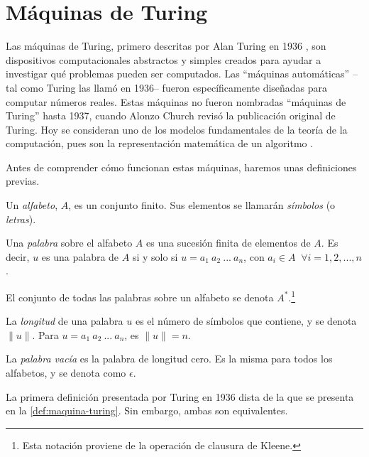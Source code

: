 

\section{Máquinas de Turing}\label{sec:maquinas-turing}

Las máquinas de Turing, primero descritas por Alan Turing en 1936 \cite{Turing1937}, son dispositivos computacionales abstractos y simples creados para ayudar a investigar qué problemas pueden ser computados. Las ``máquinas automáticas'' --tal como Turing las llamó en 1936-- fueron específicamente diseñadas para computar números reales. Estas máquinas no fueron nombradas ``máquinas de Turing'' hasta 1937, cuando Alonzo Church \cite{Church1937} revisó la publicación original de Turing. Hoy se consideran uno de los modelos fundamentales de la teoría de la computación, pues son la representación matemática de un algoritmo \cite{StanfordTuring2021}.

Antes de comprender cómo funcionan estas máquinas, haremos unas definiciones previas.

\begin{definicion}\label{def:preliminares}
Un \emph{alfabeto}, $A$, es un conjunto finito. Sus elementos se llamarán \emph{símbolos} (o \emph{letras}).

Una \emph{palabra} sobre el alfabeto $A$ es una sucesión finita de elementos de $A$. Es decir, $u$ es una palabra de $A$ si y solo si $u = a_1\:a_2\:...\:a_n$, con $a_i \in A \;\;\forall i = 1, 2, ..., n$.

El conjunto de todas las palabras sobre un alfabeto se denota $A^*$.\footnote{Esta notación proviene de la operación de clausura de Kleene.}

La \emph{longitud} de una palabra $u$ es el número de símbolos que contiene, y se denota $\|u\|$. Para $u = a_1\:a_2\:...\:a_n$, es $\|u\|=n$.

La \emph{palabra vacía} es la palabra de longitud cero. Es la misma para todos los alfabetos, y se denota como $\epsilon$.
\end{definicion}

La primera definición presentada por Turing en 1936 \cite{Turing1937} dista de la que se presenta en la \cref{def:maquina-turing}. Sin embargo, ambas son equivalentes.

